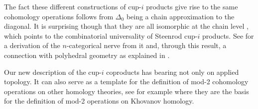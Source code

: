 The fact these different constructions of cup-$i$ products give rise to the same cohomology operations follows from $\Delta_0$ being a chain approximation to the diagonal.
It is surprising though that they are all isomorphic at the chain level \cite{medina2018axiomatic}, which points to the combinatorial universality of Steenrod cup-$i$ products.
See \cite{medina2020globular} for a derivation of the $n$-categorical nerve from it and, through this result, a connection with polyhedral geometry as explained in \cite{bibid}.

Our new description of the cup-$i$ coproducts has bearing not only on applied topology.
It can also serve as a template for the definition of mod-2 cohomology operations on other homology theories, see for example \cite{bibid} where they are the basis for the definition of mod-2 operations on Khovanov homology.